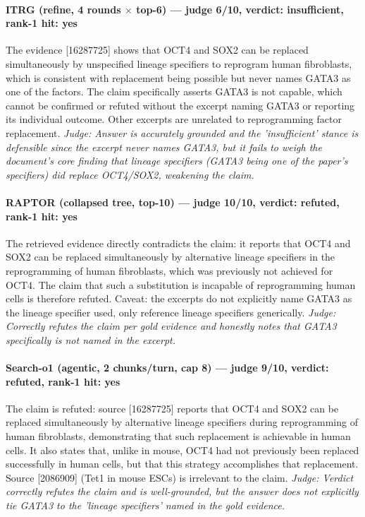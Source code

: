 \documentclass[sigconf, review, anonymous]{acmart}
\begin{document}
\paragraph{ITRG (refine, 4 rounds $\times$ top-6) --- judge 6/10, verdict: insufficient, rank-1 hit: yes}
\noindent The evidence [16287725] shows that OCT4 and SOX2 can be replaced simultaneously by unspecified lineage specifiers to reprogram human fibroblasts, which is consistent with replacement being possible but never names GATA3 as one of the factors. The claim specifically asserts GATA3 is not capable, which cannot be confirmed or refuted without the excerpt naming GATA3 or reporting its individual outcome. Other excerpts are unrelated to reprogramming factor replacement.
\noindent\small\textit{Judge: Answer is accurately grounded and the 'insufficient' stance is defensible since the excerpt never names GATA3, but it fails to weigh the document's core finding that lineage specifiers (GATA3 being one of the paper's specifiers) did replace OCT4/SOX2, weakening the claim.}
\paragraph{RAPTOR (collapsed tree, top-10) --- judge 10/10, verdict: refuted, rank-1 hit: yes}
\noindent The retrieved evidence directly contradicts the claim: it reports that OCT4 and SOX2 can be replaced simultaneously by alternative lineage specifiers in the reprogramming of human fibroblasts, which was previously not achieved for OCT4. The claim that such a substitution is incapable of reprogramming human cells is therefore refuted. Caveat: the excerpts do not explicitly name GATA3 as the lineage specifier used, only reference lineage specifiers generically.
\noindent\small\textit{Judge: Correctly refutes the claim per gold evidence and honestly notes that GATA3 specifically is not named in the excerpt.}
\paragraph{Search-o1 (agentic, 2 chunks/turn, cap 8) --- judge 9/10, verdict: refuted, rank-1 hit: yes}
\noindent The claim is refuted: source [16287725] reports that OCT4 and SOX2 can be replaced simultaneously by alternative lineage specifiers during reprogramming of human fibroblasts, demonstrating that such replacement is achievable in human cells. It also states that, unlike in mouse, OCT4 had not previously been replaced successfully in human cells, but that this strategy accomplishes that replacement. Source [2086909] (Tet1 in mouse ESCs) is irrelevant to the claim.
\noindent\small\textit{Judge: Verdict correctly refutes the claim and is well-grounded, but the answer does not explicitly tie GATA3 to the 'lineage specifiers' named in the gold evidence.}
\end{document}
